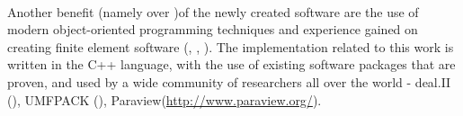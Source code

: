 \paragraph{}
Another benefit (namely over \cite{zeus})of the newly created software are the use of modern object-oriented programming techniques and experience gained on creating finite element software (\cite{ja1}, \cite{ja2}, \cite{ja3}).
The implementation related to this work is written in the C++ language, with the use of existing software packages that are proven, and used by a wide community of researchers all over the world - deal.II (\cite{deal}), UMFPACK (\cite{umfpack}), Paraview(\url{http://www.paraview.org/}).